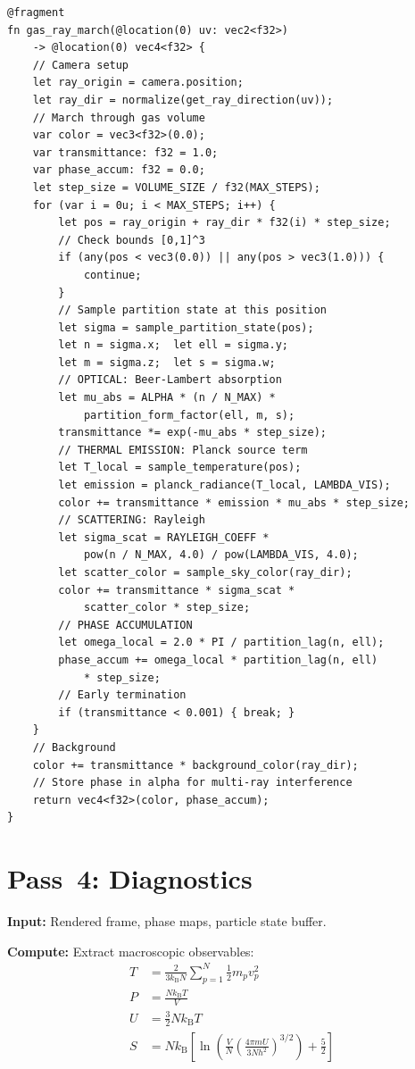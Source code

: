 \documentclass[twocolumn,10pt,a4paper]{article}
\theoremstyle{plain}
\theoremstyle{definition}
\theoremstyle{remark}
\newcommand{\kB}{k_{\mathrm{B}}}
\begin{document}
\begin{lstlisting}[style=wgsl,caption={Pass 3: Gas Ray March (WGSL pseudocode)}]
@fragment
fn gas_ray_march(@location(0) uv: vec2<f32>)
    -> @location(0) vec4<f32> {
    // Camera setup
    let ray_origin = camera.position;
    let ray_dir = normalize(get_ray_direction(uv));
    // March through gas volume
    var color = vec3<f32>(0.0);
    var transmittance: f32 = 1.0;
    var phase_accum: f32 = 0.0;
    let step_size = VOLUME_SIZE / f32(MAX_STEPS);
    for (var i = 0u; i < MAX_STEPS; i++) {
        let pos = ray_origin + ray_dir * f32(i) * step_size;
        // Check bounds [0,1]^3
        if (any(pos < vec3(0.0)) || any(pos > vec3(1.0))) {
            continue;
        }
        // Sample partition state at this position
        let sigma = sample_partition_state(pos);
        let n = sigma.x;  let ell = sigma.y;
        let m = sigma.z;  let s = sigma.w;
        // OPTICAL: Beer-Lambert absorption
        let mu_abs = ALPHA * (n / N_MAX) *
            partition_form_factor(ell, m, s);
        transmittance *= exp(-mu_abs * step_size);
        // THERMAL EMISSION: Planck source term
        let T_local = sample_temperature(pos);
        let emission = planck_radiance(T_local, LAMBDA_VIS);
        color += transmittance * emission * mu_abs * step_size;
        // SCATTERING: Rayleigh
        let sigma_scat = RAYLEIGH_COEFF *
            pow(n / N_MAX, 4.0) / pow(LAMBDA_VIS, 4.0);
        let scatter_color = sample_sky_color(ray_dir);
        color += transmittance * sigma_scat *
            scatter_color * step_size;
        // PHASE ACCUMULATION
        let omega_local = 2.0 * PI / partition_lag(n, ell);
        phase_accum += omega_local * partition_lag(n, ell)
            * step_size;
        // Early termination
        if (transmittance < 0.001) { break; }
    }
    // Background
    color += transmittance * background_color(ray_dir);
    // Store phase in alpha for multi-ray interference
    return vec4<f32>(color, phase_accum);
}
\end{lstlisting}

\section{Pass~4: Diagnostics}
\label{sec:pass4}

\textbf{Input:} Rendered frame, phase maps, particle state buffer.

\textbf{Compute:} Extract macroscopic observables:
\begin{align}
    T &= \frac{2}{3\kB N} \sum_{p=1}^{N} \frac{1}{2}m_p v_p^2 \label{eq:diag_T} \\
    P &= \frac{N\kB T}{V} \label{eq:diag_P} \\
    U &= \frac{3}{2}N\kB T \label{eq:diag_U} \\
    S &= N\kB\left[\ln\left(\frac{V}{N}\left(\frac{4\pi m U}{3Nh^2}\right)^{3/2}\right) + \frac{5}{2}\right] \label{eq:diag_S}
\end{align}
\end{document}
